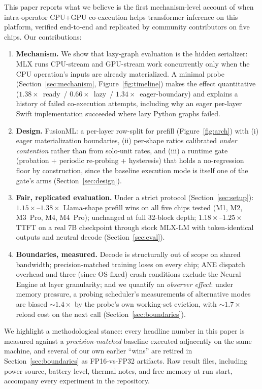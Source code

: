 \documentclass{article}
\newcommand{\sys}{FusionML}
\newcommand{\x}[1]{$#1\times$}
\begin{document}
This paper reports what we believe is the first mechanism-level account of
when intra-operator CPU+GPU co-execution helps transformer inference on this
platform, verified end-to-end and replicated by community contributors on
five chips. Our contributions:

\begin{enumerate}
\item \textbf{Mechanism.} We show that lazy-graph evaluation is the hidden
serializer: MLX runs CPU-stream and GPU-stream work concurrently only when
the CPU operation's inputs are already materialized. A minimal probe
(Section~\ref{sec:mechanism}, Figure~\ref{fig:timeline}) makes the effect
quantitative (\x{1.38}~ready~/ \x{0.66}~lazy~/ \x{1.34}~eager-boundary) and
explains a history of failed co-execution attempts, including why an eager
per-layer Swift implementation succeeded where lazy Python graphs failed.
\item \textbf{Design.} \sys{}: a per-layer row-split for prefill
(Figure~\ref{fig:arch}) with (i) eager materialization boundaries, (ii)
per-shape ratios calibrated \emph{under contention} rather than from
solo-unit rates, and (iii) a runtime gate (probation + periodic re-probing
+ hysteresis) that holds a no-regression floor by construction, since the
baseline execution mode is itself one of the gate's arms
(Section~\ref{sec:design}).
\item \textbf{Fair, replicated evaluation.} Under a strict protocol
(Section~\ref{sec:setup}): \x{1.15}--\x{1.38} Llama-shape prefill wins on
all five chips tested (M1, M2, M3~Pro, M4, M4~Pro); unchanged at full
32-block depth; \x{1.18}--\x{1.25} TTFT on a real 7B checkpoint through
stock MLX-LM with token-identical outputs and neutral decode
(Section~\ref{sec:eval}).
\item \textbf{Boundaries, measured.} Decode is structurally out of scope on
shared bandwidth; precision-matched training loses on every chip; ANE
dispatch overhead and three (since OS-fixed) crash conditions exclude the
Neural Engine at layer granularity; and we quantify an \emph{observer
effect}: under memory pressure, a probing scheduler's measurements of
alternative modes are biased $\sim$\x{1.4} by the probe's own working-set
eviction, with $\sim$\x{1.7} reload cost on the next call
(Section~\ref{sec:boundaries}).
\end{enumerate}

We highlight a methodological stance: every headline number in this paper is
measured against a \emph{precision-matched} baseline executed adjacently on
the same machine, and several of our own earlier ``wins'' are retired in
Section~\ref{sec:boundaries} as FP16-vs-FP32 artifacts. Raw result files,
including power source, battery level, thermal notes, and free memory at run
start, accompany every experiment in the repository.
\end{document}
